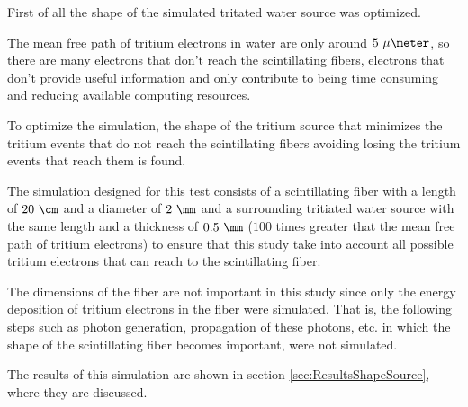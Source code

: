 First of all the shape of the simulated tritated water source was optimized. 

The mean free path of tritium electrons in water are only around $5~\mu\meter$, so there are many electrons that don't reach the scintillating fibers, electrons that don't provide useful information and only contribute to being time consuming and reducing available computing resources.

To optimize the simulation, the shape of the tritium source that minimizes the tritium events that do not reach the scintillating fibers avoiding losing the tritium events that reach them is found.

The simulation designed for this test consists of a scintillating fiber with a length of $20~\cm$ and a diameter of $2~\mm$ and a surrounding tritiated water source with the same length and a thickness of $0.5~\mm$ ($100$ times greater that the mean free path of tritium electrons) to ensure that this study take into account all possible tritium electrons that can reach to the scintillating fiber. 

The dimensions of the fiber are not important in this study since only the energy deposition of tritium electrons in the fiber were simulated. That is, the following steps such as photon generation, propagation of these photons, etc. in which the shape of the scintillating fiber becomes important, were not simulated.


The results of this simulation are shown in section \ref{sec:ResultsShapeSource}, where they are discussed.